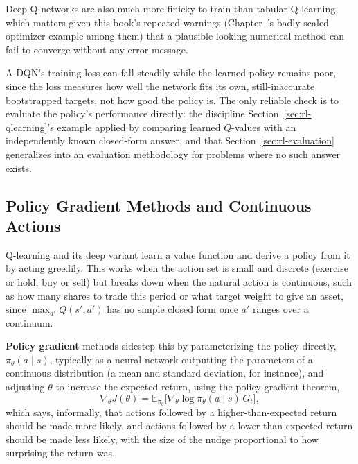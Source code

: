 \documentclass[../ai_in_finance]{subfiles}
\begin{document}
Deep Q-networks are also much more finicky to train than tabular Q-learning, which matters given this book's repeated warnings (Chapter~'s badly scaled optimizer example among them) that a plausible-looking numerical method can fail to converge without any error message.

A DQN's training loss can fall steadily while the learned policy remains poor, since the loss measures how well the network fits its own, still-inaccurate bootstrapped targets, not how good the policy is. The only reliable check is to evaluate the policy's performance directly: the discipline Section~\ref{sec:rl-qlearning}'s example applied by comparing learned $Q$-values with an independently known closed-form answer, and that Section~\ref{sec:rl-evaluation} generalizes into an evaluation methodology for problems where no such answer exists.

\subsection{Policy Gradient Methods and Continuous Actions}
\label{sec:policy-gradient}

Q-learning and its deep variant learn a value function and derive a policy from it by acting greedily. This works when the action set is small and discrete (exercise or hold, buy or sell) but breaks down when the natural action is continuous, such as how many shares to trade this period or what target weight to give an asset, since $\max_{a'} Q(s',a')$ has no simple closed form once $a'$ ranges over a continuum.

\textbf{Policy gradient} methods sidestep this by parameterizing the policy directly, $\pi_\theta(a \mid s)$, typically as a neural network outputting the parameters of a continuous distribution (a mean and standard deviation, for instance), and adjusting $\theta$ to increase the expected return, using the policy gradient theorem,
\begin{equation}
\nabla_\theta J(\theta) = \mathbb{E}_{\pi_\theta}\Big[\nabla_\theta \log \pi_\theta(a \mid s) \, G_t\Big],
\label{eq:rl-policy-gradient}
\end{equation}
which says, informally, that actions followed by a higher-than-expected return should be made more likely, and actions followed by a lower-than-expected return should be made less likely, with the size of the nudge proportional to how surprising the return was.
\end{document}
